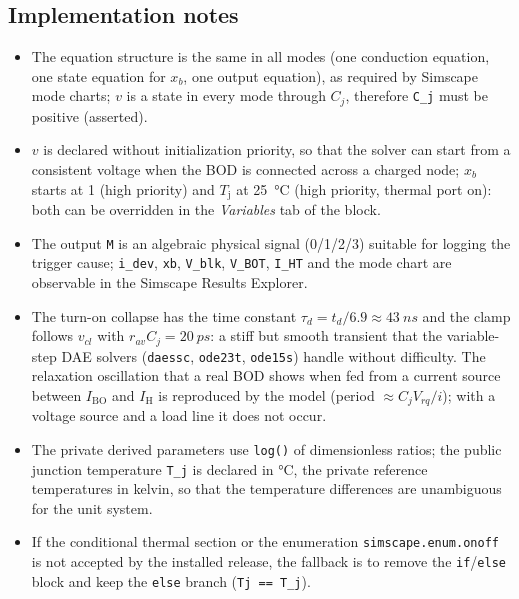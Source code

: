\documentclass[11pt,a4paper]{article}
\newcommand{\Ibo}{I_{\mathrm{BO}}}
\newcommand{\Ih}{I_{\mathrm{H}}}
\newcommand{\Tj}{T_{\mathrm{j}}}
\newcommand{\ssc}[1]{\texttt{#1}}
\begin{document}
\subsection{Implementation notes}
\begin{itemize}
\item The equation structure is the same in all modes (one conduction equation, one state equation for $x_b$, one output equation), as required by Simscape mode charts; $v$ is a state in every mode through $C_j$, therefore \ssc{C\_j} must be positive (asserted).
\item $v$ is declared without initialization priority, so that the solver can start from a consistent voltage when the BOD is connected across a charged node; $x_b$ starts at 1 (high priority) and $\Tj$ at \SI{25}{\celsius} (high priority, thermal port on): both can be overridden in the \emph{Variables} tab of the block.
\item The output \ssc{M} is an algebraic physical signal (0/1/2/3) suitable for logging the trigger cause; \ssc{i\_dev}, \ssc{xb}, \ssc{V\_blk}, \ssc{V\_BOT}, \ssc{I\_HT} and the mode chart are observable in the Simscape Results Explorer.
\item The turn-on collapse has the time constant $\tau_d = t_d/6.9 \approx \SI{43}{ns}$ and the clamp follows $v_{cl}$ with $r_{av}C_j = \SI{20}{ps}$: a stiff but smooth transient that the variable-step DAE solvers (\ssc{daessc}, \ssc{ode23t}, \ssc{ode15s}) handle without difficulty. The relaxation oscillation that a real BOD shows when fed from a current source between $\Ibo$ and $\Ih$ is reproduced by the model (period $\approx C_j V_{rq}/i$); with a voltage source and a load line it does not occur.
\item The private derived parameters use \ssc{log()} of dimensionless ratios; the public junction temperature \ssc{T\_j} is declared in \si{\celsius}, the private reference temperatures in kelvin, so that the temperature differences are unambiguous for the unit system.
\item If the conditional thermal section or the enumeration \ssc{simscape.enum.onoff} is not accepted by the installed release, the fallback is to remove the \ssc{if}/\ssc{else} block and keep the \ssc{else} branch (\ssc{Tj == T\_j}).
\end{itemize}
\end{document}
